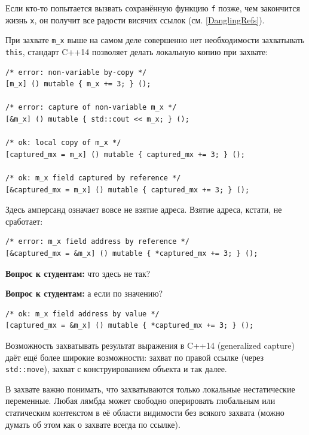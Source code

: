 \documentclass[a4paper,12pt,oneside]{article}
\newif\ifanswers
\begin{document}
Если кто-то попытается вызвать сохранённую функцию \lstinline!f! позже, чем закончится жизнь \lstinline!x!, он получит все радости висячих ссылок (см. \ref{DanglingRefs}).

При захвате \lstinline!m_x! выше на самом деле совершенно нет необходимости захватывать \lstinline!this!, стандарт C++14 позволяет делать локальную копию при захвате:

\begin{lstlisting}
/* error: non-variable by-copy */
[m_x] () mutable { m_x += 3; } (); 

/* error: capture of non-variable m_x */
[&m_x] () mutable { std::cout << m_x; } (); 

/* ok: local copy of m_x */
[captured_mx = m_x] () mutable { captured_mx += 3; } (); 

/* ok: m_x field captured by reference */
[&captured_mx = m_x] () mutable { captured_mx += 3; } (); 
\end{lstlisting}

Здесь амперсанд означает вовсе не взятие адреса. Взятие адреса, кстати, не сработает:

\begin{lstlisting}
/* error: m_x field address by reference */
[&captured_mx = &m_x] () mutable { *captured_mx += 3; } ();
\end{lstlisting}

\textbf{Вопрос к студентам:} что здесь не так?

\ifanswers
Правильный ответ следует из простого размышления: что вообще синтаксически должна означать запись в такой адрес? Перемещение поля класса, хм?
\fi

\textbf{Вопрос к студентам:} а если по значению?

\begin{lstlisting}
/* ok: m_x field address by value */
[captured_mx = &m_x] () mutable { *captured_mx += 3; } ();
\end{lstlisting}

\ifanswers
Правильный ответ: да, по значению все хорошо
\fi

Возможность захватывать результат выражения в C++14 (generalized capture) даёт ещё более широкие возможности: захват по правой ссылке (через \lstinline!std::move!), захват с конструированием объекта и так далее.

В захвате важно понимать, что захватываются только локальные нестатические переменные. Любая лямбда может свободно оперировать глобальным или статическим контекстом в её области видимости без всякого захвата (можно думать об этом как о захвате всегда по ссылке).
\end{document}
